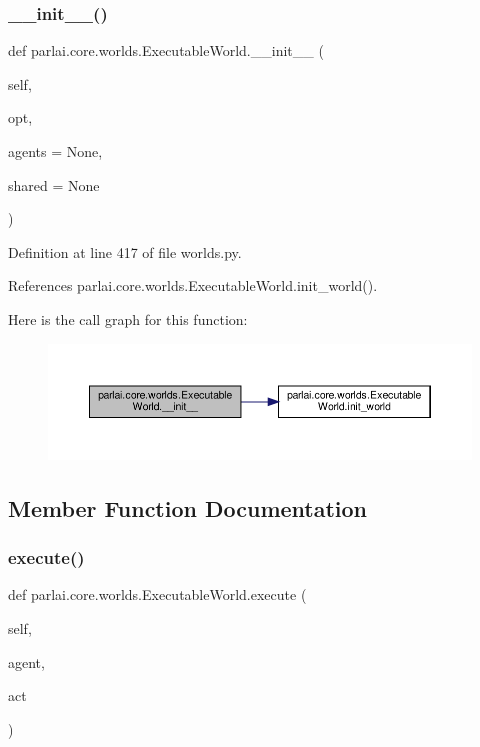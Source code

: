 \subsubsection{\texorpdfstring{\+\_\+\+\_\+init\+\_\+\+\_\+()}{\_\_init\_\_()}}
{\footnotesize\ttfamily def parlai.\+core.\+worlds.\+Executable\+World.\+\_\+\+\_\+init\+\_\+\+\_\+ (\begin{DoxyParamCaption}\item[{}]{self,  }\item[{}]{opt,  }\item[{}]{agents = {\ttfamily None},  }\item[{}]{shared = {\ttfamily None} }\end{DoxyParamCaption})}



Definition at line 417 of file worlds.\+py.



References parlai.\+core.\+worlds.\+Executable\+World.\+init\+\_\+world().

Here is the call graph for this function\+:
\nopagebreak
\begin{figure}[H]
\begin{center}
\leavevmode
\includegraphics[width=350pt]{classparlai_1_1core_1_1worlds_1_1ExecutableWorld_a53d0974884562c0c2f92727dcc5a811b_cgraph}
\end{center}
\end{figure}


\subsection{Member Function Documentation}
\mbox{\label{classparlai_1_1core_1_1worlds_1_1ExecutableWorld_a318fbf7c75178f62a6d46647f1a063fa}} 
\subsubsection{\texorpdfstring{execute()}{execute()}}
{\footnotesize\ttfamily def parlai.\+core.\+worlds.\+Executable\+World.\+execute (\begin{DoxyParamCaption}\item[{}]{self,  }\item[{}]{agent,  }\item[{}]{act }\end{DoxyParamCaption})}

